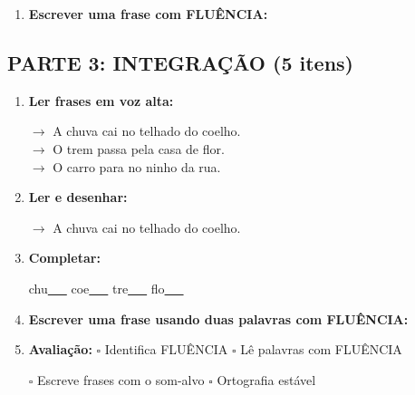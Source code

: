 \begin{exercicio}
\begin{enumerate}[resume]
  \item \textbf{Escrever uma frase com FLUÊNCIA:}
  \begin{center}
  \underline{\hspace{12cm}}
  \end{center}

\end{enumerate}

\subsection*{PARTE 3: INTEGRAÇÃO (5 itens)}

\begin{enumerate}[resume]

  \item \textbf{Ler frases em voz alta:}
  \begin{center}
  $\rightarrow$ A chuva cai no telhado do coelho.\\
  $\rightarrow$ O trem passa pela casa de flor.\\
  $\rightarrow$ O carro para no ninho da rua.\\
  \end{center}

  \item \textbf{Ler e desenhar:}
  \begin{center}
  $\rightarrow$ A chuva cai no telhado do coelho.
  \end{center}
  \begin{center}
  \end{center}

  \item \textbf{Completar:}
  \begin{center}
  chu\underline{~~~} \quad coe\underline{~~~} \quad tre\underline{~~~} \quad flo\underline{~~~}
  \end{center}

  \item \textbf{Escrever uma frase usando duas palavras com FLUÊNCIA:}
  \begin{center}
  \underline{\hspace{12cm}}
  \end{center}

  \item \textbf{Avaliação:} $\square$ Identifica FLUÊNCIA \quad $\square$ Lê palavras com FLUÊNCIA
  \begin{center}
  $\square$ Escreve frases com o som-alvo \quad $\square$ Ortografia estável
  \end{center}


\end{enumerate}
\end{exercicio}
